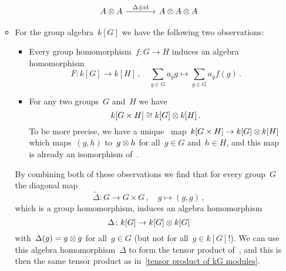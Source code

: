 \begin{remark}
\begin{enumerate}
\begin{itemize}
\[\begin{tikzcd}[sep = large]
                A \tensor A
                \arrow{r}[above]{\Delta \tensor \id}
              & A \tensor A \tensor A
            \end{tikzcd}
          \]
        \item
          For the group algebra~$k[G]$ we have the following two observations:
          \begin{itemize}
            \item
              Every group homomorphism~$f \colon G \to H$ induces an algebra homomorphism
              \[
                        F
                \colon  k[G]
                \to     k[H] \,,
                \quad   \sum_{g \in G} a_g g
                \mapsto \sum_{g \in G} a_g f(g) \,.
              \]
            \item
              For any two groups~$G$ and~$H$ we have
              \[
                      k[G \times H]
                \cong k[G] \otimes k[H] \,.
              \]
              To be more precise, we have a unique~{\klin} map~$k[G \times H] \to k[G] \otimes k[H]$ which maps~$(g,h)$ to~$g \otimes h$ for all~$g \in G$ and~$h \in H$, and this map is already an isomorphism of~{\kalgs}.
          \end{itemize}
          By combining both of these observations we find that for every group~$G$ the diagonal map
          \[
                    \tilde{\Delta}
            \colon  G
            \to     G \times G  \,,
            \quad   g
            \mapsto (g,g) \,,
          \]
          which is a group homomorphism, induces an algebra homomorphism
          \[
                    \Delta
            \colon  k[G]
            \to     k[G] \otimes k[G]
          \]
          with~$\Delta(g) = g \otimes g$ for all~$g \in G$ (but not for all~$g \in k[G]$!).
          We can use this algebra homomorphism~$\Delta$ to form the tensor product of~{}, and this is then the same tensor product as in~\eqref{tensor product of kG modules}.
      \end{itemize}
  \end{enumerate}
\end{remark}





\subsection{}



